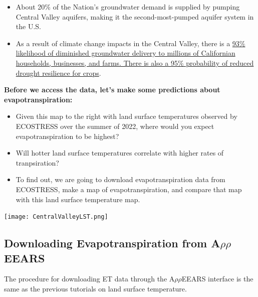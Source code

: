 \documentclass[oneside,a4paper,11pt,explicit]{book}
\begin{document}
\begin{tcolorbox}[colback=yellow!5!white,colframe=IceCreamLeaf,title=\textbf{California's Central Valley}]
\begin{multicols}{2}
\begin{itemize}
			\item About 20\% of the Nation's groundwater demand is supplied by pumping Central Valley aquifers, making it the second-most-pumped aquifer system in the U.S.
			\item As a result of climate change impacts in the Central Valley, there is a \href{https://www.energy.ca.gov/sites/default/files/2019-12/Water_CCCA4-EXT-2018-001_ada.pdf}{93\% likelihood of diminished groundwater delivery to millions of Californian households, businesses, and farms. There is also a 95\% probability of reduced drought resilience for crops}. 
		\end{itemize}
	\end{multicols}
\end{tcolorbox}

\begin{tcolorbox}[colback=yellow!5!white,colframe=IceCreamLeaf,title=\textbf{Hypotheses}]
	\begin{multicols}{2}

		\vspace*{.25em}

		\textbf{Before we access the data, let's make some predictions about evapotranspiration:}

		\begin{itemize}
			\item Given this map to the right with land surface temperatures observed by ECOSTRESS over the summer of 2022, where would you expect evapotranspiration to be highest?
			\item Will hotter land surface temperatures correlate with higher rates of tranpsiration?
			\item To find out, we are going to download evapotranspiration data from ECOSTRESS, make a map of evapotranspiration, and compare that map with this land surface temperature map.
		\end{itemize}

		\columnbreak	

		\centerline{\texttt{[image: CentralValleyLST.png]}}
		
	\end{multicols}
\end{tcolorbox}

\subsection{Downloading Evapotranspiration from A$\rho\rho$EEARS}

The procedure for downloading ET data through the A$\rho\rho$EEARS interface is the same as the previous tutorials on land surface temperature.
\end{document}
